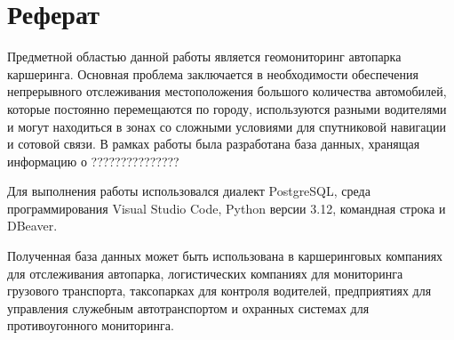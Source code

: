 \section*{Реферат}

Предметной областью данной работы является геомониторинг автопарка каршеринга. Основная проблема заключается в необходимости обеспечения непрерывного отслеживания местоположения большого количества автомобилей, которые постоянно перемещаются по городу, используются разными водителями и могут находиться в зонах со сложными условиями для спутниковой навигации и сотовой связи. В рамках работы была разработана база данных, хранящая информацию о ???????????????

Для выполнения работы использовался диалект PostgreSQL, среда программирования Visual Studio Code, Python версии 3.12, командная строка и DBeaver.

Полученная база данных может быть использована в каршеринговых компаниях для отслеживания автопарка, логистических компаниях для мониторинга грузового транспорта, таксопарках для контроля водителей, предприятиях для управления служебным автотранспортом и охранных системах для противоугонного мониторинга.

\newpage